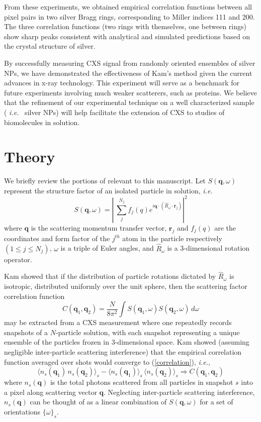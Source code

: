 \documentclass [11pt,fleqn]{article}
\def \be {\begin{equation}}
\def \ee {\end{equation}}
\begin{document}
From these experiments, we obtained empirical correlation functions between all pixel pairs in two silver Bragg rings, corresponding to Miller indices 111 and 200. The three correlation functions (two rings with themselves, one between rings) show sharp peaks consistent with analytical and simulated predictions based on the crystal structure of silver.

By successfully measuring CXS signal from randomly oriented ensembles of silver NPs, we have demonstrated the effectiveness of Kam's method given the current advances in x-ray technology. This experiment will serve as a benchmark for future experiments involving much weaker scatterers, such as proteins. We believe that the refinement of our experimental technique on a well characterized sample ( \textit{i.e.}~ silver NPs) will help facilitate the extension of CXS to studies of biomolecules in solution.

\section{Theory}

We briefly review the portions of \cite{Kam:1977wc} relevant to this manuscript. Let $S( \bm q,\omega)$ represent the structure factor of an isolated particle in solution, \textit{i.e.}
\be \label{structurefactor}
S(\bm q,\omega) = \left| \> \sum_{j}^{N_j} f_j (q )e^{i \bm q \cdot  \left( \hat{R}_\omega \cdot \bm r_j\right)  } \right| ^{2}
\ee
where $\bm q$ is the scattering momentum transfer vector,  $\bm r_j$ and $f_j (q )$ are the coordinates and form factor of the $j^{th}$ atom in the particle respectively $( 1 \leq j \leq N_{j} )$, $\omega$ is a triple of Euler angles, and $\hat{R}_\omega$ is a 3-dimensional rotation operator.

Kam showed that if the distribution of particle rotations dictated by $\hat{R}_\omega$ is isotropic, distributed uniformly over the unit sphere, then the scattering factor correlation function
\be \label{correlation}
C(\bm q_1, \bm q_2) = \frac{N}{8 \pi^{2}}\int S( \bm q_{1},\omega ) S( \bm q_{2},\omega ) \, d \omega
\ee
may be extracted from a CXS measurement where one repeatedly records snapshots of a $N$-particle solution, with each snapshot representing a unique ensemble of the particles frozen in 3-dimensional space. Kam showed (assuming negligible inter-particle scattering interference) that the empirical correlation function averaged over shots would converge to (\ref{correlation}), \textit{i.e.},
\be \label{converge}
\big \langle   n_s(\bm q_1)  \, n_s(\bm q_2) \big \rangle_s  - \big \langle {n}_s(\bm q_1) \big \rangle_s \, \big \langle {n}_s(\bm q_2) \big \rangle_s   \Rightarrow C(\bm q_1, \bm q_2) 
\ee
where $n_{s}(\bm q)$ is the total photons scattered from all particles in snapshot $s$ into a pixel along scattering vector $\bm q$. Neglecting inter-particle scattering interference, $n_{s}(\bm q)$ can be thought of as a linear combination of $S(\bm q,\omega)$ for a set of orientations $\{ \omega\}_{s}$.
\end{document}
